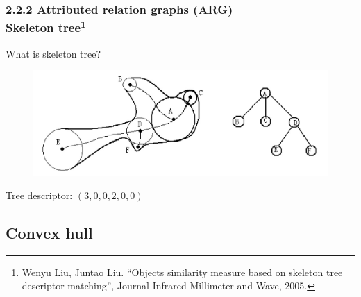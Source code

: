 \documentclass[notheorems,serif,table,compress]{beamer}  %
\begin{document}
\begin{frame}
\frametitle{2.2.2 Attributed relation graphs (ARG) \\ \normalsize{Skeleton tree\footnote{Wenyu Liu, Juntao Liu. ``Objects similarity measure based on skeleton tree descriptor matching'', Journal Infrared Millimeter and Wave, 2005.}}}
What is skeleton tree?%
            \begin{figure}
              \centering
              \includegraphics[width=0.6\linewidth]{tree} 
            \end{figure}
            \centering Tree descriptor: $(3,0,0,2,0,0)$
\end{frame}

\subsection{Convex hull}
\end{document}
